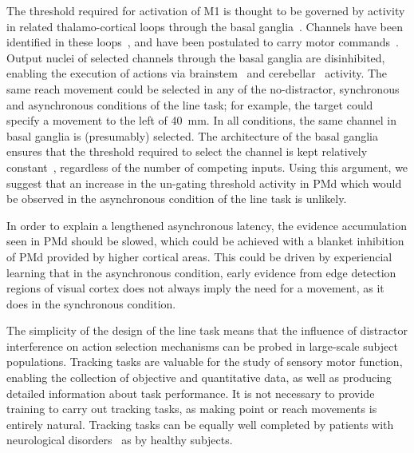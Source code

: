 \documentclass[10pt,letterpaper]{article}
\begin{document}
The threshold required for activation of M1 is thought to be governed
by activity in related thalamo-cortical loops through the basal
ganglia~\cite{parent_functional_1995,humphries_role_2002}. Channels
have been identified in these loops~\cite{zarzecki_distribution_1991},
and have been postulated to carry motor
commands~\cite{graybiel_basal_1994,doya_complementary_2000,middleton_basal_2000}.
Output nuclei of selected channels through the basal ganglia are
disinhibited, enabling the execution of actions via
brainstem~\cite{roseberry_cell-type-specific_2016} and
cerebellar~\cite{fortier_cerebellar_1989} activity. The same reach
movement could be selected in any of the no-distractor, synchronous
and asynchronous conditions of the line task; for example, the target
could specify a movement to the left of 40~mm. In all conditions, the
same channel in basal ganglia is (presumably) selected. The
architecture of the basal ganglia ensures that the threshold required
to select the channel is kept relatively
constant~\cite{gurney_computational_2001,bogacz_basal_2007},
regardless of the number of competing inputs. Using this argument, we
suggest that an increase in the un-gating threshold activity in PMd
which would be observed in the asynchronous condition of the line task
is unlikely.

In order to explain a lengthened asynchronous latency, the evidence
accumulation seen in PMd should be slowed, which could be achieved
with a blanket inhibition of PMd provided by higher cortical areas.
This could be driven by experiencial learning that in the asynchronous
condition, early evidence from edge detection regions of visual cortex
does not always imply the need for a movement, as it does in the
synchronous condition.


%

The simplicity of the design of the line task means that the influence
of distractor interference on action selection mechanisms can be
probed in large-scale subject populations.  Tracking tasks are
valuable for the study of sensory motor function, enabling the
collection of objective and quantitative data, as well as producing
detailed information about task performance. It is not necessary to
provide training to carry out tracking tasks, as making point or reach
movements is entirely natural. Tracking tasks can be equally well
completed by patients with neurological
disorders~\cite{hocherman_recruitment_2004} as by healthy subjects.
\end{document}
